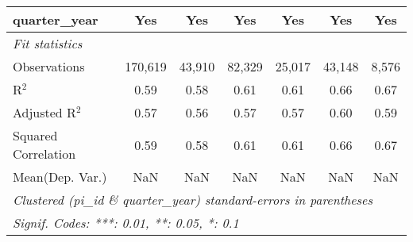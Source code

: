 \begin{tabular}{lcccccc}
   quarter\_year                                              & Yes           & Yes           & Yes           & Yes           & Yes          & Yes\\  
   \midrule
   \emph{Fit statistics}\\
   Observations                                               & 170,619       & 43,910        & 82,329        & 25,017        & 43,148       & 8,576\\  
   R$^2$                                                      & 0.59          & 0.58          & 0.61          & 0.61          & 0.66         & 0.67\\  
   Adjusted R$^2$                                             & 0.57          & 0.56          & 0.57          & 0.57          & 0.60         & 0.59\\  
   Squared Correlation                                        & 0.59          & 0.58          & 0.61          & 0.61          & 0.66         & 0.67\\  
Mean(Dep. Var.) & NaN & NaN & NaN & NaN & NaN & NaN \\
   \midrule \midrule
   \multicolumn{7}{l}{\emph{Clustered (pi\_id \& quarter\_year) standard-errors in parentheses}}\\
   \multicolumn{7}{l}{\emph{Signif. Codes: ***: 0.01, **: 0.05, *: 0.1}}\\
\end{tabular}
\par\endgroup
